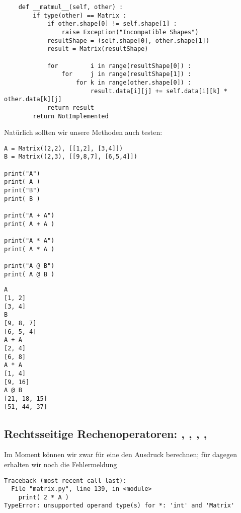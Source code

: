 \begin{codebox}
\begin{verbatim}
    def __matmul__(self, other) :
        if type(other) == Matrix :
            if other.shape[0] != self.shape[1] :
                raise Exception("Incompatible Shapes")
            resultShape = (self.shape[0], other.shape[1])
            result = Matrix(resultShape)
            
            for         i in range(resultShape[0]) :
                for     j in range(resultShape[1]) :
                    for k in range(other.shape[0]) :
                        result.data[i][j] += self.data[i][k] * other.data[k][j]
            return result
        return NotImplemented
\end{verbatim}
\end{codebox}

Natürlich sollten wir unsere Methoden auch testen:

\begin{codebox}
\begin{verbatim}
A = Matrix((2,2), [[1,2], [3,4]])
B = Matrix((2,3), [[9,8,7], [6,5,4]])

print("A")
print( A )
print("B")
print( B )

print("A + A")
print( A + A )

print("A * A")
print( A * A )

print("A @ B")
print( A @ B )
\end{verbatim}
\end{codebox}

\begin{cmdbox}
\begin{verbatim}
A
[1, 2]
[3, 4]
B
[9, 8, 7]
[6, 5, 4]
A + A
[2, 4]
[6, 8]
A * A
[1, 4]
[9, 16]
A @ B
[21, 18, 15]
[51, 44, 37]
\end{verbatim}
\end{cmdbox}

\subsection{Rechtsseitige Rechenoperatoren: , , , , }
Im Moment können wir zwar für eine  den Ausdruck  berechnen; für  dagegen erhalten wir noch die Fehlermeldung
\begin{cmdbox}
\begin{verbatim}
Traceback (most recent call last):
  File "matrix.py", line 139, in <module>
    print( 2 * A )
TypeError: unsupported operand type(s) for *: 'int' and 'Matrix'
\end{verbatim}
\end{cmdbox}

